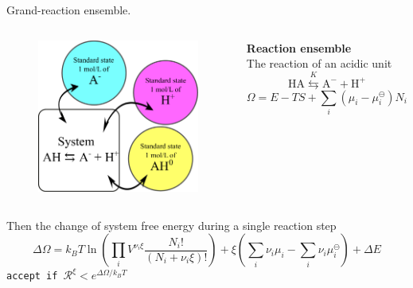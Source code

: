 \documentclass[10pt]{beamer}
\begin{document}
{

}

{

\begin{frame}{Grand-reaction ensemble.}

	\begin{columns}[T,onlytextwidth]%
			\begin{figure}
				\includegraphics[height=4.cm]{figures/standard_states.pdf}
			\end{figure} 
			\textbf{Reaction ensemble}\\ 
			\vspace{1cm}
			The reaction of an acidic unit 
			\begin{equation*}
				\mathrm{HA}\stackrel{K}{\leftrightarrows}\mathrm{A^-}+\mathrm{H^+}\label{eq: acid reaction}
			\end{equation*}
			\begin{equation*}
				\Omega=E-TS+\sum_i\left(\mu_i-\mu^\ominus_i\right) N_i\label{eq:Omega-RE}
			\end{equation*}
	\end{columns} %
	\vspace{1cm}
	Then the change of system free energy during a single reaction step
	\begin{equation*}
		\Delta\Omega=k_BT\ln\left(\prod_i V^{\nu_i\xi}\frac{N_i!}{\left(N_i+\nu_i\xi\right)!}\right)+
		\xi\left(\sum_i\nu_i\mu_i-\sum_i\nu_i\mu_i^\ominus\right)+\Delta E
		\label{eq: DeltaG RE one}
	\end{equation*}
	{\tt accept if $\mathcal{R}^{\xi}<e^{\Delta\Omega/k_BT}$}
\end{frame}
}
\end{document}
